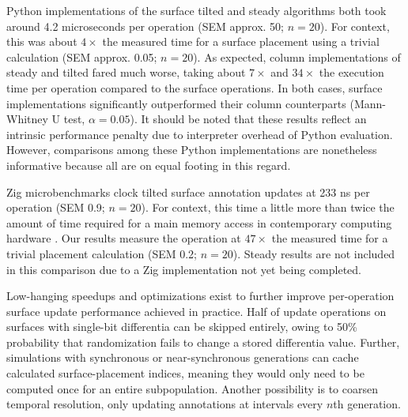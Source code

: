 Python implementations of the surface tilted and steady algorithms both took around 4.2 microseconds per operation (SEM approx. 50; $n=20$).
For context, this was about $4\times$ the measured time for a surface placement using a trivial calculation (SEM approx. 0.05; $n=20$).
As expected, column implementations of steady and tilted fared much worse, taking about $7\times$ and $34\times$ the execution time per operation compared to the surface operations.
In both cases, surface implementations significantly outperformed their column counterparts (Mann-Whitney U test, $\alpha = 0.05$).
It should be noted that these results reflect an intrinsic performance penalty due to interpreter overhead of Python evaluation.
However, comparisons among these Python implementations are nonetheless informative because all are on equal footing in this regard.

Zig microbenchmarks clock tilted surface annotation updates at 233 ns per operation (SEM 0.9; $n=20$).
For context, this time a little more than twice the amount of time required for a main memory access in contemporary computing hardware \citep{markus2022memory}.
Our results measure the operation at $47\times$ the measured time for a trivial placement calculation (SEM 0.2; $n=20$).
Steady results are not included in this comparison due to a Zig implementation not yet being completed.

Low-hanging speedups and optimizations exist to further improve per-operation surface update performance achieved in practice.
Half of update operations on surfaces with single-bit differentia can be skipped entirely, owing to 50\% probability that randomization fails to change a stored differentia value.
Further, simulations with synchronous or near-synchronous generations can cache calculated surface-placement indices, meaning they would only need to be computed once for an entire subpopulation.
Another possibility is to coarsen temporal resolution, only updating annotations at intervals every $n$th generation.

